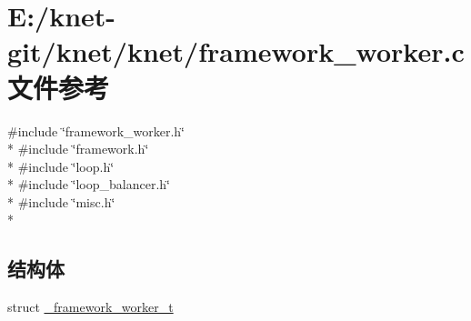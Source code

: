 \hypertarget{a00059}{}\section{E\+:/knet-\/git/knet/knet/framework\+\_\+worker.c 文件参考}
\label{a00059}
{\ttfamily \#include \char`\"{}framework\+\_\+worker.\+h\char`\"{}}\\*
{\ttfamily \#include \char`\"{}framework.\+h\char`\"{}}\\*
{\ttfamily \#include \char`\"{}loop.\+h\char`\"{}}\\*
{\ttfamily \#include \char`\"{}loop\+\_\+balancer.\+h\char`\"{}}\\*
{\ttfamily \#include \char`\"{}misc.\+h\char`\"{}}\\*
\subsection*{结构体}
\begin{DoxyCompactItemize}
\item 
struct \hyperlink{a00014}{\+\_\+framework\+\_\+worker\+\_\+t}
\end{DoxyCompactItemize}
